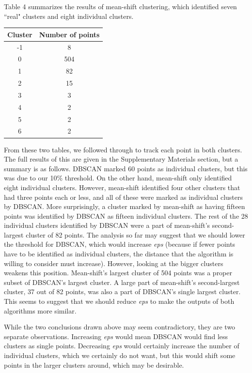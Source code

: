 \documentclass[12pt,a4paper,twocolumn]{article}
\begin{document}
	Table 4 summarizes the results of mean-shift clustering, which identified seven ``real" clusters and eight individual clusters.\\
	
	\begin{tabular}{|c|c|}
		\hline 
		\textbf{Cluster} & \textbf{Number of points} \\ 
		\hline 
		-1 & 8 \\ 
		\hline 
		0 & 504 \\ 
		\hline 
		1 & 82 \\ 
		\hline 
		2 & 15 \\ 
		\hline 
		3 & 3 \\ 
		\hline 
		4 & 2 \\ 
		\hline 
		5 & 2 \\ 
		\hline 
		6 & 2 \\ 
		\hline 
	\end{tabular} 
	\begingroup
	\endgroup
	\hfill\break
	
	From these two tables, we followed through to track each point in both clusters. The full results of this are given in the Supplementary Materials section, but a summary is as follows. DBSCAN marked 60 points as individual clusters, but this was due to our 10\% threshold. On the other hand, mean-shift only identified eight individual clusters. However, mean-shift identified four other clusters that had three points each or less, and all of these were marked as individual clusters by DBSCAN. More surprisingly, a cluster marked by mean-shift as having fifteen points was identified by DBSCAN as fifteen individual clusters. The rest of the 28 individual clusters identified by DBSCAN were a part of mean-shift's second-largest cluster of 82 points. The analysis so far may suggest that we should lower the threshold for DBSCAN, which would increase \textit{eps} (because if fewer points have to be identified as individual clusters, the distance that the algorithm is willing to consider must increase). However, looking at the bigger clusters weakens this position. Mean-shift's largest cluster of 504 points was a proper subset of DBSCAN's largest cluster. A large part of mean-shift's second-largest cluster, 37 out of 82 points, was also a part of DBSCAN's single largest cluster. This seems to suggest that we should reduce \textit{eps} to make the outputs of both algorithms more similar.
	
	While the two conclusions drawn above may seem contradictory, they are two separate observations. Increasing \textit{eps} would mean DBSCAN would find less clusters as single points. Decreasing \textit{eps} would certainly increase the number of individual clusters, which we certainly do not want, but this would shift some points in the larger clusters around, which may be desirable.
	
\end{document}
